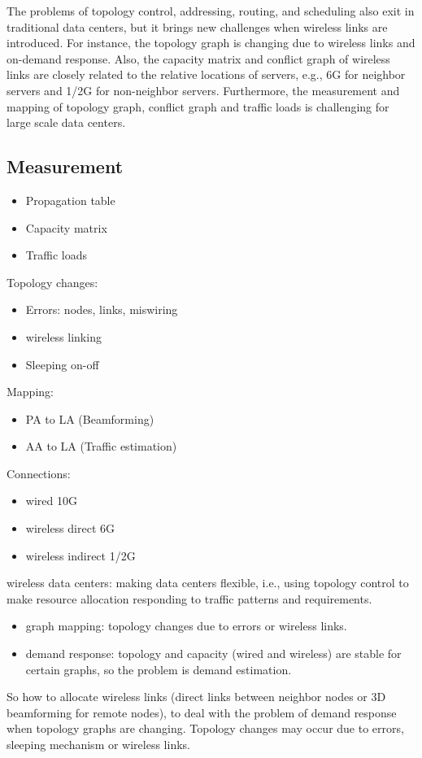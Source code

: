 \documentclass[journal,onecolumn,11pt]{IEEEtran}
\begin{document}
The problems of topology control, addressing, routing, and scheduling also exit in traditional data centers, but it brings new challenges when wireless links are introduced. For instance, the topology graph is changing due to wireless links and on-demand response. Also, the capacity matrix and conflict graph of wireless links are closely related to the relative locations of servers, e.g., 6G for neighbor servers and 1/2G for non-neighbor servers. Furthermore, the measurement and mapping of topology graph, conflict graph and traffic loads is challenging for large scale data centers.

\subsection{Measurement}

\begin{itemize}
  \item Propagation table
  \item Capacity matrix
  \item Traffic loads
\end{itemize}

Topology changes:
\begin{itemize}
  \item Errors: nodes, links, miswiring
  \item wireless linking
  \item Sleeping on-off
\end{itemize}

Mapping:
\begin{itemize}
  \item PA to LA (Beamforming)
  \item AA to LA (Traffic estimation)
\end{itemize}

Connections:
\begin{itemize}
  \item wired 10G
  \item wireless direct 6G
  \item wireless indirect 1/2G
\end{itemize}

wireless data centers: making data centers flexible, i.e., using topology control to make resource allocation responding to traffic patterns and requirements.
\begin{itemize}
  \item graph mapping: topology changes due to errors or wireless links.
  \item demand response: topology and capacity (wired and wireless) are stable for certain graphs, so the problem is demand estimation.
\end{itemize}
So how to allocate wireless links (direct links between neighbor nodes or 3D beamforming for remote nodes), to deal with the problem of demand response when topology graphs are changing. Topology changes may occur due to errors, sleeping mechanism or wireless links.
\end{document}
